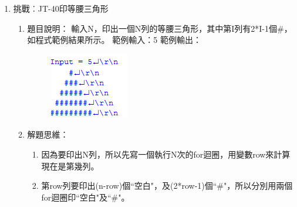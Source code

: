 \begin{enumerate}
\begin{enumerate}

		\end{enumerate}
	
	\item 挑戰︰JT-40印等腰三角形
		\begin{enumerate}
			\item 題目說明：
			\subitem 輸入N，印出一個N列的等腰三角形，其中第I列有2*I-1個\#，如程式範例結果所示。
			\subitem 範例輸入：5
			\subitem 範例輸出：
			\begin{figure}[H]
				\centering
				\includegraphics{fig/JT40fig}
			\end{figure}
			
			\item 解題思維：
			\begin{enumerate}
				\item 因為要印出N列，所以先寫一個執行N次的for迴圈，用變數row來計算現在是第幾列。
				\item 第row列要印出(n-row)個``空白"，及(2*row-1)個``\#"，所以分別用兩個for迴圈印``空白"及``\#"。
			\end{enumerate}

		\end{enumerate}

\end{enumerate}


